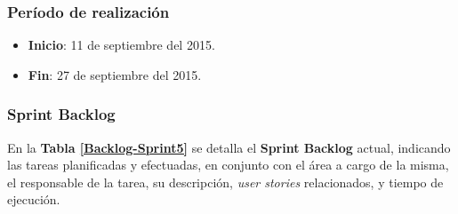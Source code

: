 \subsubsection{Período de realización}
\begin{itemize}
    \item \textbf{Inicio}: 11 de septiembre del 2015.
    \item \textbf{Fin}: 27 de septiembre del 2015.
\end{itemize}

\subsubsection{Sprint Backlog}

En la \textbf{Tabla \ref{Backlog-Sprint5}} se detalla el \textbf{Sprint Backlog} actual, indicando las tareas planificadas y efectuadas, en conjunto con el área a cargo de la misma, el responsable de la tarea, su descripción, \textit{user stories} relacionados, y tiempo de ejecución.

